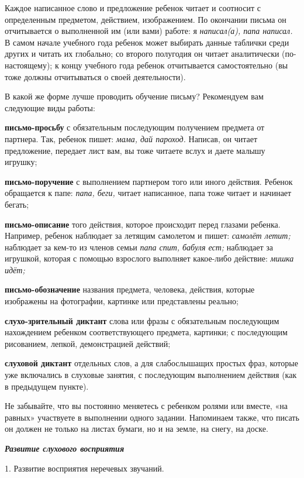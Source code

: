 \documentclass{book}
\renewcommand{\emph}[1]{\textit{#1}}
\begin{document}
Каждое написанное слово и предложение ребенок читает и соотносит с
определенным предметом, действием, изображением. По окончании письма он
отчитывается о выполненной им (или вами) работе: я \emph{написал(а),
папа написал.} В самом начале учебного года ребенок может выбирать
данные таблички среди других и читать их глобально\textsc{;} со второго
полугодия он читает аналитически (по-настоящему); к концу учебного года
ребенок отчитывается самостоятельно (вы тоже должны отчитываться о своей
деятельности).

В какой же форме лучше проводить обучение письму? Рекомендуем вам
следующие виды работы:

\textbf{письмо-просьбу} с обязательным последующим получением предмета
от партнера. Так, ребенок пишет: \emph{мама, дай пароход.} Написав, он
читает предложение, передает лист вам, вы тоже читаете вслух и даете
малышу игрушку;

\textbf{письмо-поручение} с выполнением партнером того или иного
действия. Ребенок обращается к папе: \emph{папа, беги,} читает
написанное, папа тоже читает и начинает бегать;

\textbf{письмо-описание} того действия, которое происходит перед глазами
ребенка. Например, ребенок наблюдает за летящим самолетом и пишет:
\emph{самолёт летит;} наблюдает за кем-то из членов семьи \emph{папа
спит, бабуля ест;} наблюдает за игрушкой, которая с помощью взрослого
выполняет какое-либо действие: \emph{мишка идёт;}

\textbf{письмо-обозначение} названия предмета, человека, действия,
которые изображены на фотографии, картинке или представлены реально;

\textbf{слухо-зрительный диктант} слова или фразы с обязательным
последующим нахождением ребенком соответствующего предмета, картинки; с
последующим рисованием, лепкой, демонстрацией действий;

\textbf{слуховой диктант} отдельных слов, а для слабослышащих простых
фраз, которые уже включались в слуховые занятия, с последующим
выполнением действия (как в предыдущем пункте).

Не забывайте, что вы постоянно меняетесь с ребенком ролями или вместе,
«на равных» участвуете в выполнении одного задании. Напоминаем также,
что писать он должен не только на листах бумаги, но и на земле, на
снегу, на доске.

\emph{\textbf{Развитие слухового восприятия}}

1. Развитие восприятия неречевых звучаний.
\end{document}
